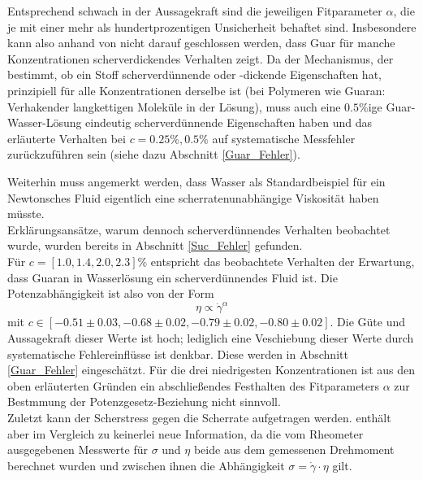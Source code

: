 \documentclass[11pt,a4paper,oneside]{scrartcl}
\begin{document}
Entsprechend schwach in der Aussagekraft sind die jeweiligen Fitparameter $\alpha$, die je mit einer mehr als hundertprozentigen Unsicherheit behaftet sind. Insbesondere kann also anhand von  nicht darauf geschlossen werden, dass Guar für manche Konzentrationen scherverdickendes Verhalten zeigt. Da der Mechanismus, der bestimmt, ob ein Stoff scherverdünnende oder -dickende Eigenschaften hat, prinzipiell für alle Konzentrationen derselbe ist (bei Polymeren wie Guaran: \glqq Verhaken\Grqq der langkettigen Moleküle in der Lösung), muss auch eine $0.5\%$ige Guar-Wasser-Lösung eindeutig scherverdünnende Eigenschaften haben und das erläuterte Verhalten bei $c=0.25\%,0.5\%$ auf systematische Messfehler zurückzuführen sein (siehe dazu Abschnitt \ref{Guar_Fehler}).\par
Weiterhin muss angemerkt werden, dass Wasser als Standardbeispiel für ein Newtonsches Fluid eigentlich eine scherratenunabhängige Viskosität haben müsste. \\ Erklärungsansätze, warum dennoch scherverdünnendes Verhalten beobachtet wurde, wurden bereits in Abschnitt \ref{Suc_Fehler} gefunden.\\
Für $c=[1.0,1.4,2.0,2.3]\%$ entspricht das beobachtete Verhalten der Erwartung, dass Guaran in Wasserlösung ein scherverdünnendes Fluid ist. Die Potenzabhängigkeit ist also von der Form \begin{equation}\eta\propto\dot\gamma^\alpha\end{equation} mit $c\in[-0.51\pm0.03,-0.68\pm0.02,-0.79\pm0.02,-0.80\pm0.02]$. Die Güte und Aussagekraft dieser Werte ist hoch; lediglich eine Veschiebung dieser Werte durch systematische Fehlereinflüsse ist denkbar. Diese werden in Abschnitt \ref{Guar_Fehler} eingeschätzt. Für die drei niedrigesten Konzentrationen ist aus den oben erläuterten Gründen ein abschließendes Festhalten des Fitparameters $\alpha$ zur Bestmmung der Potenzgesetz-Beziehung nicht sinnvoll. \\
Zuletzt kann der Scherstress gegen die Scherrate aufgetragen werden.  enthält aber im Vergleich zu  keinerlei neue Information, da die vom Rheometer ausgegebenen Messwerte für $\sigma$ und $\eta$ beide aus dem gemessenen Drehmoment berechnet wurden und zwischen ihnen die Abhängigkeit $\sigma=\dot\gamma\cdot\eta$ gilt.
\end{document}
